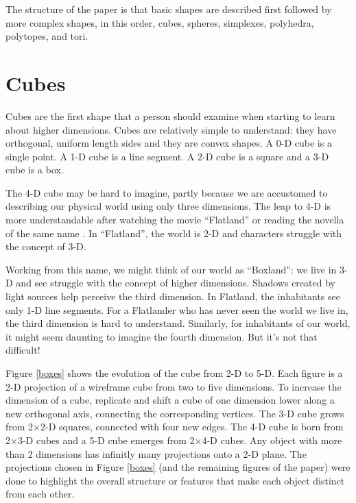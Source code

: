 The structure of the paper is that basic shapes are described first
followed by more complex shapes, in this order,
cubes, spheres, simplexes, polyhedra, polytopes, and tori.







\section{Cubes}


Cubes are the first shape that a person should examine when
starting to learn about higher dimensions. Cubes are relatively simple
to understand: they have orthogonal, uniform length sides and they are
convex shapes. A 0-D cube is a single point. A 1-D cube is a line segment.
A 2-D cube is a square and a 3-D cube is a box.

The 4-D cube may be hard to imagine, partly because we are accustomed
to describing our physical world using only three dimensions.  The
leap to 4-D is more understandable after watching the movie
``Flatland'' \citep{Ma65} or reading the novella of the same name
\citep{Ab1884}. In ``Flatland'', the world is 2-D and characters struggle
with the concept of 3-D.

Working from this name, we might think of our world as ``Boxland'': we live in 3-D and see
struggle with the concept of higher dimensions. Shadows created by light sources help
perceive the third dimension. In Flatland, the inhabitants see only
1-D line segments. For a Flatlander who has never seen the world we
live in, the third dimension is hard to understand. Similarly,
for inhabitants of our world, it might seem daunting to imagine the
fourth dimension. But it's not that difficult!

Figure \ref{boxes} shows the evolution of the cube from 2-D to
5-D. Each figure is a 2-D projection of a wireframe cube from two to five
dimensions.
To increase the dimension of a cube, replicate and shift a cube of one dimension lower along a new orthogonal axis,
connecting the corresponding vertices. The 3-D cube grows from 2$\times$2-D squares,
connected with four new edges. The 4-D cube is born from 2$\times$3-D
cubes and a 5-D cube emerges from 2$\times$4-D cubes.
Any object with more than 2 dimensions has infinitly many projections onto a 2-D
plane. The projections chosen in Figure \ref{boxes} (and the remaining figures of the
paper) were done to highlight the overall structure or features that make each object
distinct from each other.

